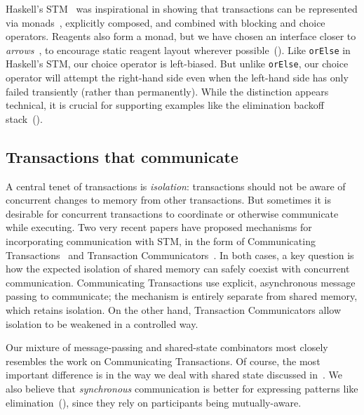 \documentclass[preprint,nocopyrightspace]{sigplanconf}
\begin{document}
Haskell's STM~\cite{Harris2005a} was inspirational in showing that transactions
can be represented via monads~\cite{PeytonJones1993}, explicitly composed, and
combined with blocking and choice operators.  Reagents also form a monad, but we
have chosen an interface closer to \emph{arrows}~\cite{Hughes2000}, to encourage
static reagent layout wherever possible~().  Like
\lstinline{orElse} in Haskell's STM, our choice operator is left-biased.  But
unlike \lstinline{orElse}, our choice operator will attempt the right-hand side
even when the left-hand side has only failed transiently (rather than
permanently).  While the distinction appears technical, it is crucial for
supporting examples like the elimination backoff stack~().

\subsection{Transactions that communicate}

A central tenet of transactions is \emph{isolation}: transactions should not
be aware of concurrent changes to memory from other transactions.  But
sometimes it is desirable for concurrent transactions to coordinate or
otherwise communicate while executing.  Two very recent papers have proposed
mechanisms for incorporating communication with STM, in the form of
Communicating Transactions~\cite{Lesani2011} and Transaction
Communicators~\cite{Luchangco2011b}.  In both cases, a key
question is how the expected isolation of shared memory can safely coexist
with concurrent communication.  Communicating Transactions use explicit,
asynchronous message passing to communicate; the mechanism is entirely
separate from shared memory, which retains isolation.  On the other hand,
Transaction Communicators allow isolation to be weakened in a controlled way.

Our mixture of message-passing and shared-state combinators most closely
resembles the work on Communicating Transactions.  Of course, the most important
difference is in the way we deal with shared state  discussed in~.  We also
believe that \emph{synchronous} communication is better for expressing
patterns like elimination~(), since they rely on 
participants being mutually-aware.  %

\end{document}
